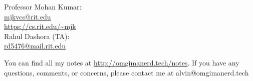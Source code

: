 \documentclass[letterpaper, 12pt]{math}
\begin{document}
\noindent Professor Mohan Kumar: \\
\url{mjkvcs@rit.edu} \\
\url{https://cs.rit.edu/~mjk} \\

\noindent Rahul Dashora (TA): \\
\url{rd5476@mail.rit.edu} \\

\begin{center}
  You can find all my notes at \url{http://omgimanerd.tech/notes}. If you have
  any questions, comments, or concerns, please contact me at
  alvin@omgimanerd.tech
\end{center}
\end{document}
